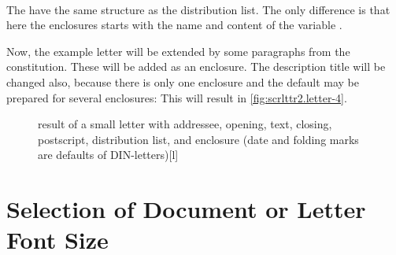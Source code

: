 \begin{Declaration}
  \\
\end{Declaration}
%
%
The  have the same structure as the distribution list.
The only difference is that here the enclosures starts with the name
and content of the variable
.
\begin{Example}
  Now, the example letter will be extended by some paragraphs from the
  constitution. These will be added as an enclosure. The description title
  will be changed also, because there is only one enclosure and the default
  may be prepared for several enclosures:
  This will result in \autoref{fig:scrlttr2.letter-4}.
  \begin{figure}
    \setcapindent{0pt}%
    \begin{captionbeside}{%
        result of a small letter with addressee, opening, text, closing,
        postscript, distribution list, and enclosure
        (date and folding marks are defaults of DIN-letters)}[l]
    \end{captionbeside}
    \label{fig:scrlttr2.letter-4}
  \end{figure}
\end{Example}
%
%
%
%


\section{Selection of Document or Letter Font Size}

